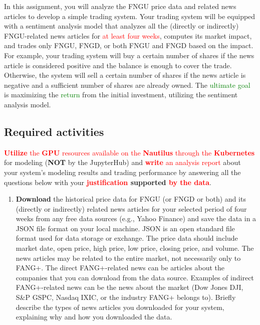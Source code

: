 \documentclass[twocolumn,12pt]{article}
\begin{document}
\begin{multicols}{2}
\begin{flushleft}
In this assignment, you will analyze the FNGU price data and related news articles to develop a simple trading system. Your trading system will be equipped with a sentiment analysis model that analyzes all the (directly or indirectly) FNGU-related news articles for \textcolor{red}{at least four weeks}, computes its market impact, and trades only FNGU, FNGD, or both FNGU and FNGD based on the impact. For example, your trading system will buy a certain number of shares if the news article is considered positive and the balance is enough to cover the trade. Otherwise, the system will sell a certain number of shares if the news article is negative and a sufficient number of shares are already owned. The \textcolor{green}{ultimate goal} is maximizing the \textcolor{green}{return} from the initial investment, utilizing the sentiment analysis model.

\subsection*{Required activities}
\textcolor{red}{\textbf{Utilize} the \textbf{GPU} resources available on the \textbf{Nautilus} through the \textbf{Kubernetes}} for modeling (\textbf{NOT} by the JupyterHub) and \textcolor{red}{\textbf{write} an analysis report} about your system's modeling results and trading performance by answering all the questions below with your \textbf{\textcolor{red}{justification} supported \textcolor{red}{by the data}}.

\begin{enumerate}
	\item \textbf{Download} the historical price data for FNGU (or FNGD or both) and its (directly or indirectly) related news articles for your selected period of four weeks from any free data sources (e.g., Yahoo Finance) and save the data in a JSON file format on your local machine. JSON is an open standard file format used for data storage or exchange. The price data should include market date, open price, high price, low price, closing price, and volume. The news articles may be related to the entire market, not necessarily only to FANG+. The direct FANG+-related news can be articles about the companies that you can download from the data source. Examples of indirect FANG+-related news can be the news about the market (Dow Jones \scalebox{.8}{\textsuperscript{$\wedge$}}DJI, S\&P \scalebox{.8}{\textsuperscript{$\wedge$}}GSPC, Nasdaq \scalebox{.8}{\textsuperscript{$\wedge$}}IXIC, or the industry FANG+ belongs to). Briefly describe the types of news articles you downloaded for your system, explaining why and how you downloaded the data.\\
	

\end{enumerate}
\end{flushleft}
\end{multicols}
\end{document}
